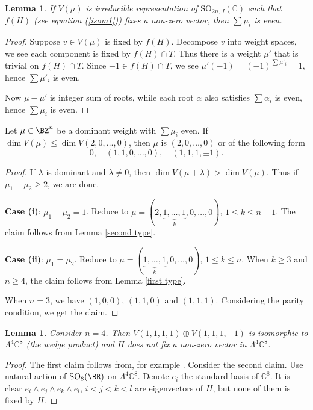 \documentclass[a4paper]{amsart}
\newcommand{\BC}{{\mathbb {C}}} \newcommand{\BD}{{\mathbb {D}}}
\newcommand{\SO}{{\mathrm{SO}}}\newcommand{\so}{\mathfrak{so}}
\theoremstyle{plain}
\newtheorem{lem}[thm]{Lemma}
\theoremstyle{remark} \newtheorem{remark}[thm]{Remark}
\theoremstyle{remark} \newtheorem{exercise}{Exercise}
\theoremstyle{remark} \newtheorem{example}{Example}
\numberwithin{equation}{section}
\begin{document}
\begin{lem}
    If $V(\mu)$ is irreducible representation of $\SO_{2n,J}(\BC)$ such that $f(H)$ (see equation (\ref{isom1})) fixes a non-zero vector, then $\sum\mu_i$ is even.
\end{lem}
\begin{proof}
    Suppose $v\in V(\mu)$ is fixed by $f(H)$. Decompose $v$ into weight spaces, we see each component is fixed by $f(H)\cap T$. Thus there is a weight $\mu'$ that is trivial on $f(H)\cap T$. Since $-1\in f(H)\cap T$, we see $\mu'(-1)=(-1)^{\sum\mu'_i}=1$, hence $\sum\mu'_i$ is even.

    Now $\mu-\mu'$ is integer sum of roots, while each root $\alpha$ also satisfies $\sum\alpha_i$ is even, hence $\sum\mu_i$ is even.
\end{proof}

\begin{prop}\label{type1-condition}
    Let $\mu\in\BZ^n$ be a dominant weight with $\sum\mu_i$ even. If $\dim V(\mu)\leqslant\dim V(2,0,\ldots,0)$, then $\mu$ is $(2,0,\ldots,0)$ or of the following form
    \[0,\quad (1,1,0,\ldots,0),\quad (1,1,1,\pm 1).\]
\end{prop}
\begin{proof}
    If $\lambda$ is dominant and $\lambda\neq 0$, then $\dim V(\mu+\lambda)>\dim V(\mu)$. Thus if $\mu_1-\mu_2\geqslant 2$, we are done. 
	
    \textbf{Case (i)}: $\mu_1-\mu_2=1$. Reduce to $\mu=(2,\underbrace{1,\ldots,1}_k,0,\ldots,0)$, $1\leqslant k\leqslant n-1$. The claim follows from Lemma \ref{second type}.
	
    \textbf{Case (ii)}: $\mu_1=\mu_2$. Reduce to $\mu=(\underbrace{1,\ldots,1}_k,0,\ldots,0)$, $1\leqslant k\leqslant n$. When $k\geqslant 3$ and $n\geqslant 4$, the claim follows from Lemma \ref{first type}.
	
    When $n=3$, we have $(1,0,0)$, $(1,1,0)$ and $(1,1,1)$. Considering the parity condition, we get the claim.
\end{proof}

\begin{lem}\label{even-exception}
    Consider $n=4$. Then $V(1,1,1,1)\oplus V(1,1,1,-1)$ is isomorphic to $\Lambda^4\BC^8$ (the wedge product) and $H$ does not fix a non-zero vector in $\Lambda^4\BC^8$.
\end{lem}
\begin{proof}
    The first claim follows from, for example \cite[Theorem 19.2, p.287]{FH91}. Consider the second claim. Use natural action of $\SO_8(\BR)$ on $\Lambda^4\BC^8$. Denote $e_i$ the standard basis of $\BC^8$. It is clear $e_i\wedge e_j\wedge e_k\wedge e_l$, $i<j<k<l$ are eigenvectors of $H$, but none of them is fixed by $H$.
\end{proof}
\end{document}
